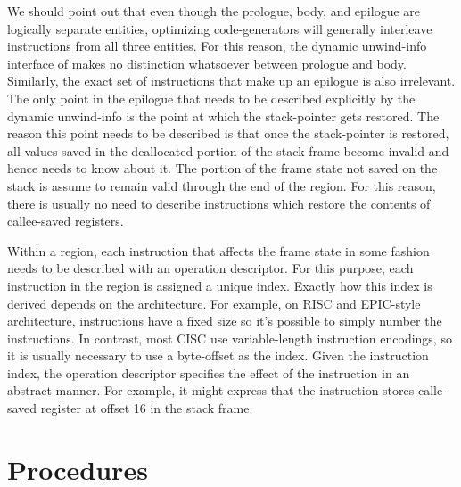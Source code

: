 \documentclass{article}
\begin{document}
We should point out that even though the prologue, body, and epilogue
are logically separate entities, optimizing code-generators will
generally interleave instructions from all three entities.  For this
reason, the dynamic unwind-info interface of  makes no
distinction whatsoever between prologue and body.  Similarly, the
exact set of instructions that make up an epilogue is also irrelevant.
The only point in the epilogue that needs to be described explicitly
by the dynamic unwind-info is the point at which the stack-pointer
gets restored.  The reason this point needs to be described is that
once the stack-pointer is restored, all values saved in the
deallocated portion of the stack frame become invalid and hence
 needs to know about it.  The portion of the frame
state not saved on the stack is assume to remain valid through the end
of the region.  For this reason, there is usually no need to describe
instructions which restore the contents of callee-saved registers.

Within a region, each instruction that affects the frame state in some
fashion needs to be described with an operation descriptor.  For this
purpose, each instruction in the region is assigned a unique index.
Exactly how this index is derived depends on the architecture.  For
example, on RISC and EPIC-style architecture, instructions have a
fixed size so it's possible to simply number the instructions.  In
contrast, most CISC use variable-length instruction encodings, so it
is usually necessary to use a byte-offset as the index.  Given the
instruction index, the operation descriptor specifies the effect of
the instruction in an abstract manner.  For example, it might express
that the instruction stores calle-saved register  at offset 16
in the stack frame.

\section{Procedures}
\end{document}
